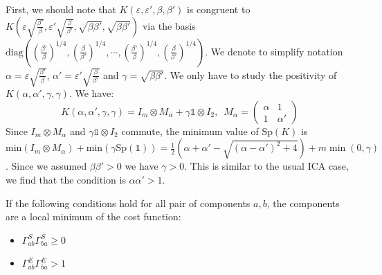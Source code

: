 First, we should note that $K(\varepsilon, \varepsilon', \beta, \beta') $ is
congruent to $K(\varepsilon \sqrt{\frac{\beta'}{\beta}}, \varepsilon'
\sqrt{\frac{\beta}{\beta'}}, \sqrt{\beta\beta'}, \sqrt{\beta\beta'})$ via the
basis \\ $\text{diag}((\frac{\beta'}{\beta})^{1/4}, (\frac{\beta}{\beta'})^{1/4}, \cdots,(\frac{\beta'}{\beta})^{1/4}, (\frac{\beta}{\beta'})^{1/4})$.
%
We denote to simplify notation $\alpha = \varepsilon \sqrt{\frac{\beta'}{\beta}}$, $\alpha' = \varepsilon' \sqrt{\frac{\beta}{\beta'}}$ and $\gamma = \sqrt{\beta\beta'}$. We only have to study the positivity of $K(\alpha, \alpha', \gamma, \gamma)$.
We have:
$$
K(\alpha, \alpha', \gamma, \gamma) =  I_m  \otimes M_\alpha+ \gamma  \mathbb{1}\otimes I_2, \enspace M_\alpha = 
\begin{pmatrix}
\alpha & 1 \\
1 & \alpha'
\end{pmatrix}
$$
Since $I_m\otimes M_\alpha$ and $\gamma \mathbb{1}\otimes I_2$ commute, the minimum value of $\text{Sp}(K)$ is $\text{min}(I_m\otimes M_\alpha) + \text{min}(\gamma\text{Sp}(\mathbb{1}))=\frac12(\alpha + \alpha' - \sqrt{(\alpha - \alpha')^2 + 4}) + m\min(0, \gamma)$.
Since we assumed $\beta \beta' > 0$ we have $\gamma > 0$. This is similar to the usual ICA case, we find that the condition is $\alpha\alpha' > 1$.

If the following conditions hold for all pair of components $a, b$, the components are a local minimum of the cost function:
\begin{itemize}
    \item $\Gamma^S_{ab}\Gamma^S_{ba}\geq 0$
    \item $\Gamma^E_{ab}\Gamma^E_{ba} > 1$
\end{itemize}

